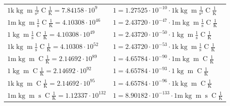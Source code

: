 \begin{center}
\begin{longtable}{l l}
{\color{gray}$1 \bm{\mathrm{ k}}\operatorname{kg}{\operatorname{m}}\frac1{\operatorname{s}^2}{\operatorname{C}}\frac1{\operatorname{K}} = 7.84158\cdot10^{9} $}   & {\color{gray}$ 1 = 1.27525\cdot10^{-10} \cdot 1 \bm{\mathrm{ k}}\operatorname{kg}{\operatorname{m}}\frac1{\operatorname{s}^2}{\operatorname{C}}\frac1{\operatorname{K}}$}  \\
{\color{gray}$1 \bm{\mathrm{ m}}\operatorname{kg}{\operatorname{m}}\frac1{\operatorname{s}}{\operatorname{C}}\frac1{\operatorname{K}} = 4.10308\cdot10^{46} $}   & {\color{gray}$ 1 = 2.43720\cdot10^{-47} \cdot 1 \bm{\mathrm{ m}}\operatorname{kg}{\operatorname{m}}\frac1{\operatorname{s}}{\operatorname{C}}\frac1{\operatorname{K}}$}  \\
{\color{black}$1 \bm{\mathrm{ }}\operatorname{kg}{\operatorname{m}}\frac1{\operatorname{s}}{\operatorname{C}}\frac1{\operatorname{K}} = 4.10308\cdot10^{49} $}   & {\color{black}$ 1 = 2.43720\cdot10^{-50} \cdot 1 \bm{\mathrm{ }}\operatorname{kg}{\operatorname{m}}\frac1{\operatorname{s}}{\operatorname{C}}\frac1{\operatorname{K}}$}  \\
{\color{gray}$1 \bm{\mathrm{ k}}\operatorname{kg}{\operatorname{m}}\frac1{\operatorname{s}}{\operatorname{C}}\frac1{\operatorname{K}} = 4.10308\cdot10^{52} $}   & {\color{gray}$ 1 = 2.43720\cdot10^{-53} \cdot 1 \bm{\mathrm{ k}}\operatorname{kg}{\operatorname{m}}\frac1{\operatorname{s}}{\operatorname{C}}\frac1{\operatorname{K}}$}  \\
{\color{gray}$1 \bm{\mathrm{ m}}\operatorname{kg}{\operatorname{m}}{}{\operatorname{C}}\frac1{\operatorname{K}} = 2.14692\cdot10^{89} $}   & {\color{gray}$ 1 = 4.65784\cdot10^{-90} \cdot 1 \bm{\mathrm{ m}}\operatorname{kg}{\operatorname{m}}{}{\operatorname{C}}\frac1{\operatorname{K}}$}  \\
{\color{black}$1 \bm{\mathrm{ }}\operatorname{kg}{\operatorname{m}}{}{\operatorname{C}}\frac1{\operatorname{K}} = 2.14692\cdot10^{92} $}   & {\color{black}$ 1 = 4.65784\cdot10^{-93} \cdot 1 \bm{\mathrm{ }}\operatorname{kg}{\operatorname{m}}{}{\operatorname{C}}\frac1{\operatorname{K}}$}  \\
{\color{gray}$1 \bm{\mathrm{ k}}\operatorname{kg}{\operatorname{m}}{}{\operatorname{C}}\frac1{\operatorname{K}} = 2.14692\cdot10^{95} $}   & {\color{gray}$ 1 = 4.65784\cdot10^{-96} \cdot 1 \bm{\mathrm{ k}}\operatorname{kg}{\operatorname{m}}{}{\operatorname{C}}\frac1{\operatorname{K}}$}  \\
{\color{gray}$1 \bm{\mathrm{ m}}\operatorname{kg}{\operatorname{m}}{\operatorname{s}}{\operatorname{C}}\frac1{\operatorname{K}} = 1.12337\cdot10^{132} $}   & {\color{gray}$ 1 = 8.90182\cdot10^{-133} \cdot 1 \bm{\mathrm{ m}}\operatorname{kg}{\operatorname{m}}{\operatorname{s}}{\operatorname{C}}\frac1{\operatorname{K}}$}  \\

\end{longtable}
\end{center}
